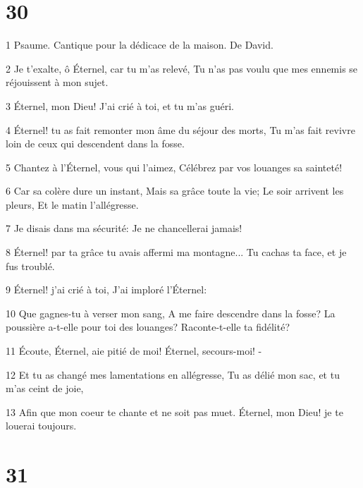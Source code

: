 \chapter{30}

\par 1 Psaume. Cantique pour la dédicace de la maison. De David.
\par 2 Je t'exalte, ô Éternel, car tu m'as relevé, Tu n'as pas voulu que mes ennemis se réjouissent à mon sujet.
\par 3 Éternel, mon Dieu! J'ai crié à toi, et tu m'as guéri.
\par 4 Éternel! tu as fait remonter mon âme du séjour des morts, Tu m'as fait revivre loin de ceux qui descendent dans la fosse.
\par 5 Chantez à l'Éternel, vous qui l'aimez, Célébrez par vos louanges sa sainteté!
\par 6 Car sa colère dure un instant, Mais sa grâce toute la vie; Le soir arrivent les pleurs, Et le matin l'allégresse.
\par 7 Je disais dans ma sécurité: Je ne chancellerai jamais!
\par 8 Éternel! par ta grâce tu avais affermi ma montagne... Tu cachas ta face, et je fus troublé.
\par 9 Éternel! j'ai crié à toi, J'ai imploré l'Éternel:
\par 10 Que gagnes-tu à verser mon sang, A me faire descendre dans la fosse? La poussière a-t-elle pour toi des louanges? Raconte-t-elle ta fidélité?
\par 11 Écoute, Éternel, aie pitié de moi! Éternel, secours-moi! -
\par 12 Et tu as changé mes lamentations en allégresse, Tu as délié mon sac, et tu m'as ceint de joie,
\par 13 Afin que mon coeur te chante et ne soit pas muet. Éternel, mon Dieu! je te louerai toujours.

\chapter{31}

